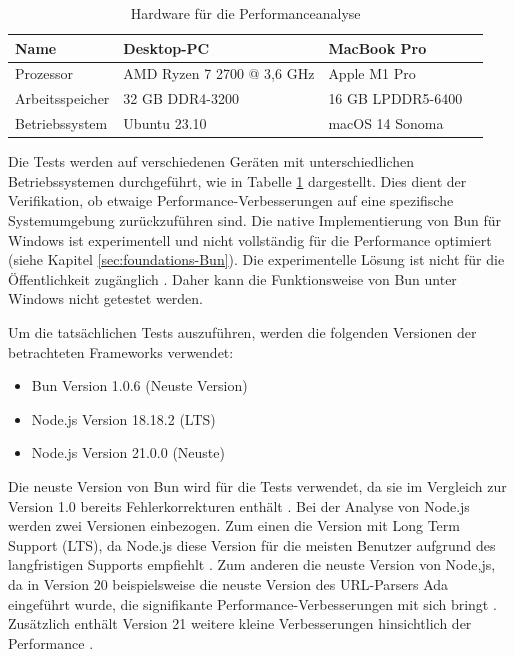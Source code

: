 \begin{table}[h]
	\centering
	\begin{tabular}{|p{3cm}|p{3cm}|p{3cm}|p{3cm}|}
		\hline
		Name & Desktop-PC & MacBook Pro \\
		\hline
		Prozessor & AMD Ryzen 7 2700 @ 3,6 GHz & Apple M1 Pro \\
		\hline
		Arbeitsspeicher & 32 GB DDR4-3200 & 16 GB LPDDR5-6400 \\
		\hline
		Betriebssystem & Ubuntu 23.10 & macOS 14 Sonoma \\
		\hline
	\end{tabular}
	\caption{Hardware für die Performanceanalyse}
	\label{table:hardware}
\end{table}

\noindent
Die Tests werden auf verschiedenen Geräten mit unterschiedlichen Betriebssystemen durchgeführt, wie in Tabelle \ref{table:hardware} dargestellt. Dies dient der Verifikation, ob etwaige Performance-Verbesserungen auf eine spezifische Systemumgebung zurückzuführen sind. Die native Implementierung von Bun für Windows ist experimentell und nicht vollständig für die Performance optimiert (siehe Kapitel \ref{sec:foundations-Bun}). Die experimentelle Lösung ist nicht für die Öffentlichkeit zugänglich \cite{Verhelst.2023}. Daher kann die Funktionsweise von Bun unter Windows nicht getestet werden.

\noindent
Um die tatsächlichen Tests auszuführen, werden die folgenden Versionen der betrachteten Frameworks verwendet:
\begin{itemize}
	\item Bun Version 1.0.6 (Neuste Version)
	\item Node.js Version 18.18.2 (LTS)
	\item Node.js Version 21.0.0 (Neuste)
\end{itemize}

\noindent
Die neuste Version von Bun wird für die Tests verwendet, da sie im Vergleich zur Version 1.0 bereits Fehlerkorrekturen enthält \cite{Sumner.2023}. Bei der Analyse von Node.js werden zwei Versionen einbezogen. Zum einen die Version mit Long Term Support (LTS), da Node.js diese Version für die meisten Benutzer aufgrund des langfristigen Supports empfiehlt \cite{OpenJSFoundation.o.J.}. Zum anderen die neuste Version von Node,js, da in Version 20 beispielsweise die neuste Version des URL-Parsers Ada eingeführt wurde, die signifikante Performance-Verbesserungen mit sich bringt \cite{OpenJSFoundation.2023}. Zusätzlich enthält Version 21 weitere kleine Verbesserungen hinsichtlich der Performance \cite{OpenJSFoundation.2023b}.


